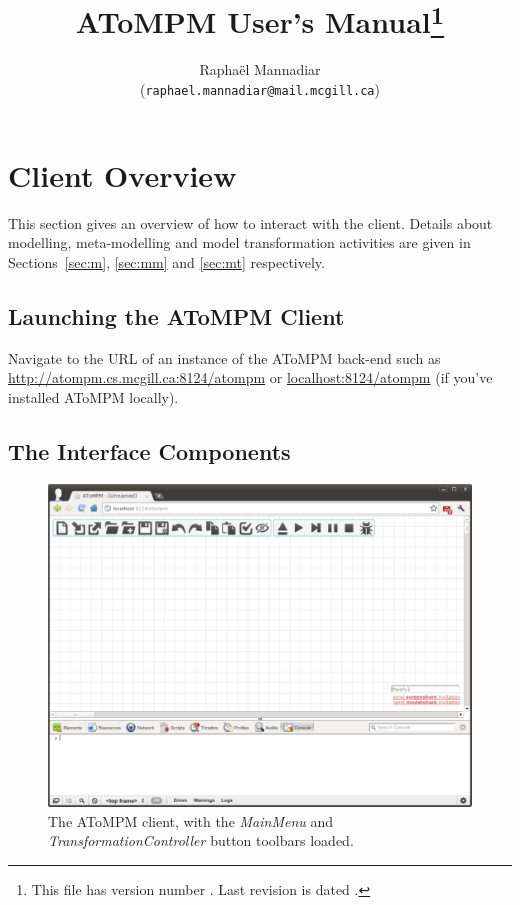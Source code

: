 \documentclass{article}
\title{\textbf{AToMPM User's Manual\footnote{This file has version number \version. Last revision is dated \versiondate.}}}
\author{Rapha\"{e}l Mannadiar\\ (\texttt{raphael.mannadiar@mail.mcgill.ca})}
\date{\versiondate}
\numberwithin{equation}{section}
\numberwithin{figure}{section}
\begin{document}
\parindent=0cm
\renewcommand*\arraystretch{1.5}		%

\maketitle
\thispagestyle{empty}	%
\newpage

\tableofcontents
\thispagestyle{empty}	%
\newpage


\section{Client Overview}
This section gives an overview of how to interact with the client. Details about modelling, meta-modelling and model transformation activities are given in Sections~\ref{sec:m}, \ref{sec:mm} and \ref{sec:mt} respectively.



\subsection{Launching the AToMPM Client}
Navigate to the URL of an instance of the AToMPM back-end such as \url{http://atompm.cs.mcgill.ca:8124/atompm} or \url{localhost:8124/atompm} (if you've installed AToMPM locally).



\subsection{The Interface Components}

\begin{figure}[h]
	\centering
	\includegraphics[scale=0.4]{figures/atompm}
	\caption{The AToMPM client, with the \textit{MainMenu} and \textit{TransformationController} button toolbars loaded.}
	\label{fig:atompm}
\end{figure}
\end{document}
